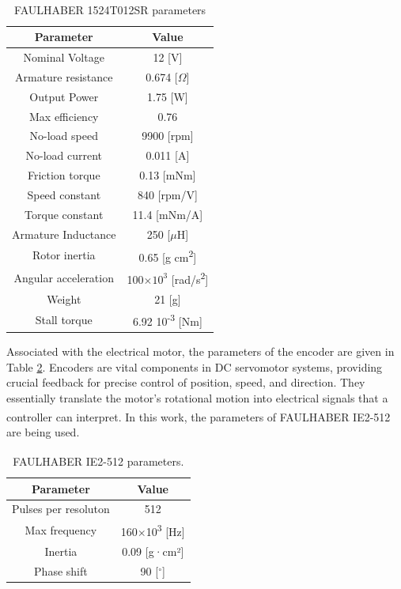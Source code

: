 \begin{table}[H]
\begin{center}
\caption{FAULHABER\textsuperscript{\textregistered} 1524T012SR parameters}
\label{tabelaparametromotor}
\begin{tabular}{|c||c|}
\hline
Parameter & Value \\ [0.5ex]
\hline\hline
Nominal Voltage & 12 [V] \\
\hline
Armature resistance & 0.674 [$\Omega$] \\
\hline
Output Power & 1.75 [W] \\
\hline
Max efficiency & 0.76 \\
\hline
No-load speed & 9900 [rpm] \\
\hline
No-load current & 0.011 [A] \\
\hline
Friction torque & 0.13 [mNm] \\
\hline
Speed constant & 840 [rpm/V] \\
\hline
Torque constant & 11.4 [mNm/A] \\
\hline
Armature Inductance & 250 [$\mu$H] \\
\hline
Rotor inertia & 0.65 [g cm\textsuperscript{2}] \\
\hline
Angular acceleration & 100$\times 10^3$ [rad/s\textsuperscript{2}] \\
\hline
Weight & 21 [g] \\
\hline
Stall torque & 6.92 10\textsuperscript{-3} [Nm] \\
\hline
\end{tabular}
\end{center}
\end{table}
Associated with the electrical motor, the parameters of the encoder are given in Table \ref{tabela encoder}. Encoders are vital components in DC servomotor systems, providing crucial feedback for precise control of position, speed, and direction. They essentially translate the motor's rotational motion into electrical signals that a controller can interpret. In this work, the parameters of FAULHABER\textsuperscript{\textregistered} IE2-512 are being used.
\begin{table}[H]
\begin{center}
\caption{FAULHABER\textsuperscript{\textregistered} IE2-512 parameters.}
\label{tabela encoder}
\begin{tabular}{|c||c|} 
 \hline
 Parameter & Value \\ [0.5ex] 
 \hline\hline
 Pulses per resoluton & 512\\ 
 \hline
 Max frequency & 160$\times$10\textsuperscript{3} [Hz]\\
 \hline
 Inertia & 0.09 [g·cm²]\\
 \hline
 Phase shift & 90 [$^\circ$]\\
 \hline
\end{tabular}
\end{center}
\end{table}

